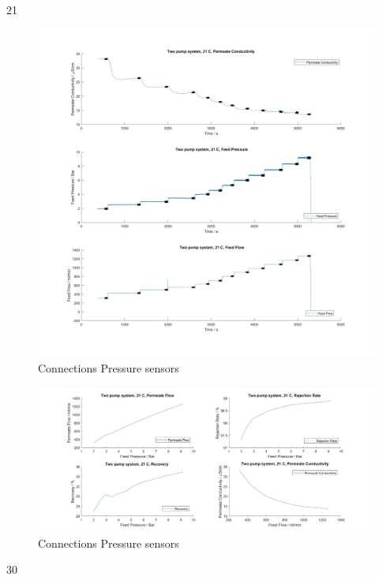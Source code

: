 21


\begin{figure}[H]
    \centering
    \includegraphics[width=1.1\textwidth]{FeedPumpIncrease21}
    \caption{Connections Pressure sensors}
    \label{fig:PressConn}
\end{figure}


\begin{figure}[H]
    \centering
    \includegraphics[width=1.1\textwidth]{FeedPumpIncrease21Key}
    \caption{Connections Pressure sensors}
    \label{fig:PressConn}
\end{figure}

30


